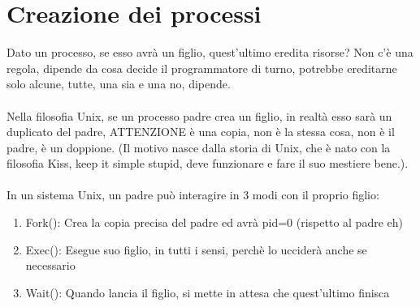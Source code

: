 \documentclass[12pt, a4paper, openany, twoside]{book}
\begin{document}
\section{Creazione dei processi}
Dato un processo, se esso avrà un figlio, quest'ultimo eredita risorse? Non c'è
una regola, dipende da cosa decide il programmatore di turno, potrebbe ereditarne
solo alcune, tutte, una sia e una no, dipende.
\\ \\
Nella filosofia Unix, se un processo padre crea un figlio, in realtà esso
sarà un duplicato del padre, ATTENZIONE è una copia, non è la stessa cosa, non è
il padre, è un doppione. (Il motivo nasce dalla storia di Unix, che è nato con
la filosofia Kiss, keep it simple stupid, deve funzionare e fare il suo mestiere
bene.).\\ \\
In un sistema Unix, un padre può interagire in 3 modi con il proprio figlio:
\begin{enumerate}
	\item Fork(): Crea la copia precisa del padre ed avrà pid=0 (rispetto al padre eh)
	\item Exec(): Esegue suo figlio, in tutti i sensi, perchè lo ucciderà anche se necessario
	\item Wait(): Quando lancia il figlio, si mette in attesa che quest'ultimo finisca
\end{enumerate} 
\end{document}
